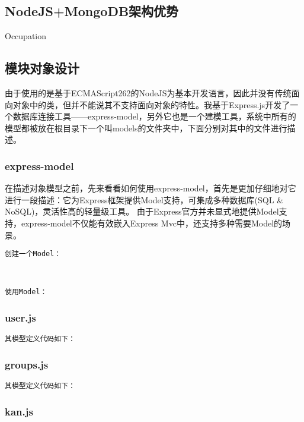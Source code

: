 
\subsection{NodeJS+MongoDB架构优势}
\indent
Occupation

\subsection{模块对象设计}
\indent
由于使用的是基于ECMAScript262的NodeJS为基本开发语言，因此并没有传统面向对象中的类，但并不能说其不支持面向对象的特性。我基于Express.js开发了一个数据库连接工具——express-model，另外它也是一个建模工具，系统中所有的模型都被放在根目录下一个叫models的文件夹中，下面分别对其中的文件进行描述。

\subsubsection{express-model}
在描述对象模型之前，先来看看如何使用express-model，首先是更加仔细地对它进行一段描述：它为Express框架提供Model支持，可集成多种数据库(SQL \& NoSQL)，灵活性高的轻量级工具。 由于Express官方并未显式地提供Model支持，express-model不仅能有效嵌入Express Mvc中，还支持多种需要Model的场景。

\clearpage

\noindent
\texttt{\large 创建一个Model：}

~

\noindent
\texttt{\large 使用Model：}


\subsubsection{user.js}

\noindent
\texttt{\large 其模型定义代码如下：}


\subsubsection{groups.js}

\noindent
\texttt{\large 其模型定义代码如下：}


\subsubsection{kan.js}

